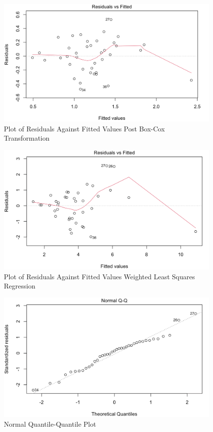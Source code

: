 \documentclass[12pt]{report}
\begin{document}
\begin{figure}[H]
    \centering
    \includegraphics[width=1\textwidth]{Adequacy tests/BC plot.png}
    \caption{Plot of Residuals Against Fitted Values Post Box-Cox Transformation} \label{fig:AT3}
\end{figure}
\noindent

\begin{figure}[H]
    \centering
    \includegraphics[width=1\textwidth]{Adequacy tests/WT plot.png}
    \caption{Plot of Residuals Against Fitted Values Weighted Least Squares Regression} \label{fig:AT4}
\end{figure}
\noindent

\begin{figure}[H]
    \centering
    \includegraphics[width=1\textwidth]{Adequacy tests/QQ plot.png}
    \caption{Normal Quantile-Quantile Plot} \label{fig:AT5}
\end{figure}
\noindent
\end{document}
